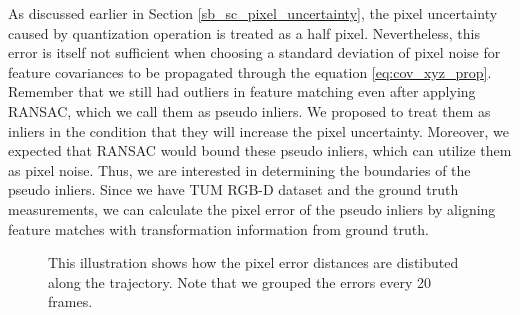 \documentclass[12pt]{report}
\numberwithin{figure}{section}
\begin{document}
As discussed earlier in Section \ref{sb_sc_pixel_uncertainty}, the pixel 
uncertainty caused by quantization operation is treated as a half pixel.  
Nevertheless, this error is itself not sufficient when choosing a standard 
deviation of pixel noise for feature covariances to be propagated through the 
equation \eqref{eq:cov_xyz_prop}. Remember that we still had outliers in 
feature matching even after applying RANSAC, which we call them as pseudo 
inliers. We proposed to treat them as inliers in the condition that they will 
increase the pixel uncertainty.  Moreover, we expected that RANSAC would bound 
these pseudo inliers, which can utilize them as pixel noise. Thus, we are 
interested in determining the boundaries of the pseudo inliers.  Since we have 
TUM RGB-D dataset and the ground truth measurements, we can calculate the 
pixel error of the pseudo inliers by aligning feature matches with 
transformation information from ground truth.


\begin{figure}[H] 
 \caption[Time-based 
Histogram of Pixel Errors]{ This illustration shows how the pixel error 
distances are distibuted along the trajectory. Note that we grouped the errors 
every 20 frames.} \label{fig:time_based_hist_pix_err} \end{figure}
\end{document}

